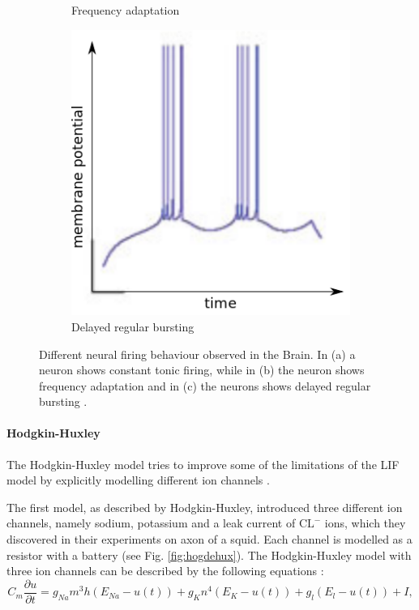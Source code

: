 \begin{figure}
\begin{subfigure}[t]{.32\textwidth}
  		\caption{Frequency adaptation}
	\end{subfigure}
	\begin{subfigure}[t]{.32\textwidth}
	 	\centering
  		\includegraphics[width=.9\linewidth]{imgs/lif_bad3.png}
  		\caption{Delayed regular bursting}
	\end{subfigure}
    \caption[Different neural firing behaviour observed in the Brain.]{Different neural firing behaviour observed in the Brain. In (a) a neuron shows constant tonic firing, while in (b) the neuron shows frequency adaptation and in (c) the neurons shows delayed regular bursting \cite{gerstner2014neuronal}.}
	\label{fig:neuronbe}
\end{figure}



\paragraph{Hodgkin-Huxley} \label{c:hodghux}

The Hodgkin-Huxley model tries to improve some of the limitations of the LIF model by explicitly modelling different ion channels \cite{Hodgkin1952}\cite{gerstner2014neuronal}. 

The first model, as described by Hodgkin-Huxley, introduced three different ion channels, namely sodium, potassium and a leak current of $\text{CL}^{-}$ ions, which they discovered in their experiments on axon of a squid.
Each channel is modelled as a resistor with a battery (see Fig. \ref{fig:hogdehux}).
The Hodgkin-Huxley model with three ion channels can be described by the following equations :
\[
C_m \frac{\partial u}{\partial t} = g_{Na} m^3 h (E_{Na} - u(t)) + g_K n^4 (E_K - u(t)) + g_l (E_l - u(t)) + I,
\]


